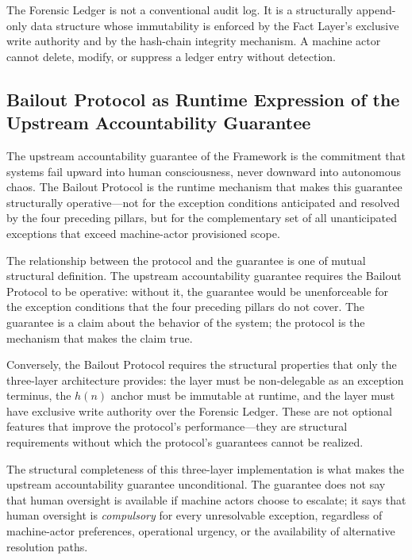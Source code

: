 The Forensic Ledger is not a conventional audit log. It is a structurally append-only data structure whose immutability is enforced by the Fact Layer's exclusive write authority and by the hash-chain integrity mechanism. A machine actor cannot delete, modify, or suppress a ledger entry without detection.

\subsection{Bailout Protocol as Runtime Expression of the Upstream Accountability Guarantee}\label{sec:runtime-expression}

The upstream accountability guarantee of the \bxthree{} Framework is the commitment that \bxthree{} systems fail upward into human consciousness, never downward into autonomous chaos. The Bailout Protocol is the runtime mechanism that makes this guarantee structurally operative---not for the exception conditions anticipated and resolved by the four preceding pillars, but for the complementary set of all unanticipated exceptions that exceed machine-actor provisioned scope.

The relationship between the protocol and the guarantee is one of mutual structural definition. The upstream accountability guarantee requires the Bailout Protocol to be operative: without it, the guarantee would be unenforceable for the exception conditions that the four preceding pillars do not cover. The guarantee is a claim about the behavior of the system; the protocol is the mechanism that makes the claim true.

Conversely, the Bailout Protocol requires the structural properties that only the \bxthree{} three-layer architecture provides: the \purpose{} layer must be non-delegable as an exception terminus, the $h(n)$ anchor must be immutable at runtime, and the \fact{} layer must have exclusive write authority over the Forensic Ledger. These are not optional features that improve the protocol's performance---they are structural requirements without which the protocol's guarantees cannot be realized.

The structural completeness of this three-layer implementation is what makes the upstream accountability guarantee unconditional. The guarantee does not say that human oversight is available if machine actors choose to escalate; it says that human oversight is \emph{compulsory} for every unresolvable exception, regardless of machine-actor preferences, operational urgency, or the availability of alternative resolution paths.

